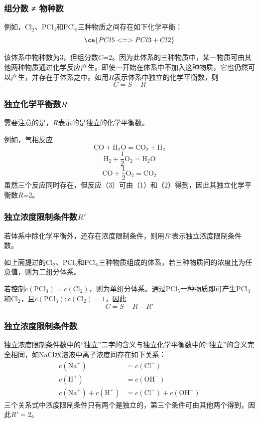 \begin{frame}
    \frametitle{组分数 ≠ 物种数}

    例如，Cl$_2$、PCl$_3$和PCl$_5$三种物质之间存在如下化学平衡：
    $$\ce{PCl5 <=> PCl3 + Cl2}$$

    该体系中物种数为3，但组分数$C$=2。因为此体系的三种物质中，某一物质可由其他两种物质通过化学反应产生。即使一开始在体系中不加入这种物质，它也仍然可以产生，并存在于体系之中。如用$R$表示体系中独立的化学平衡数，则
    $$C=S-R$$

\end{frame}


\begin{frame}
    \frametitle{独立化学平衡数$R$}

    需要注意的是，$R$表示的是独立的化学平衡数。

    例如，气相反应
    $$\mathrm{CO}+\mathrm{H}_{2} \mathrm{O}=\mathrm{CO}_{2}+\mathrm{H}_{2}$$
    $$\mathrm{H}_{2}+\frac{1}{2} \mathrm{O}_{2}=\mathrm{H}_{2} \mathrm{O}$$
    $$\mathrm{CO}+\frac{1}{2} \mathrm{O}_{2}=\mathrm{CO}_{2}$$
    虽然三个反应同时存在，但反应（3）可由（1）和（2）得到，因此其独立化学平衡数$R$=2。

\end{frame}


\begin{frame}
    \frametitle{独立浓度限制条件数$R'$}

    若体系中除化学平衡外，还存在浓度限制条件，则用$R'$表示独立浓度限制条件数。
    
    如上面提过的Cl$_2$、PCl$_3$和PCl$_5$三种物质组成的体系，若三种物质间的浓度比为任意值，则为二组分体系。
    
    若控制$c(\mathrm{PCl_3})=c(\mathrm{Cl_2})$，则为单组分体系。通过PCl$_5$一种物质即可产生PCl$_3$和Cl$_2$，且$c(\mathrm{PCl_3}):c(\mathrm{Cl_2})=1$，因此
    $$C=S-R-R'$$

\end{frame}


\begin{frame}
    \frametitle{独立浓度限制条件数}
    独立浓度限制条件数中的“独立”二字的含义与独立化学平衡数中的“独立”的含义完全相同，如NaCl水溶液中离子浓度间存在如下关系：
    $$\begin{aligned}    
    c(\mathrm{Na}^{+}) &=c(\mathrm{Cl}^{-}) \\
    c(\mathrm{H}^{+}) &=c(\mathrm{OH}^{-}) \\
    c(\mathrm{Na}^{+})+c(\mathrm{H}^{+}) &=c(\mathrm{Cl}^{-})+c(\mathrm{OH}^{-})
    \end{aligned}$$
    三个关系式中浓度限制条件只有两个是独立的，第三个条件可由其他两个得到，因此$R'=2$。

\end{frame}


